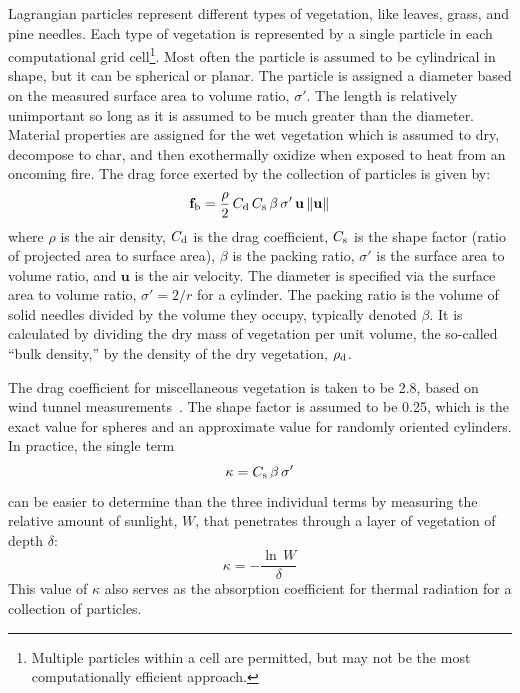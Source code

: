 \documentclass[journal,article,atmosphere,submit,moreauthors,pdftex]{Definitions_Review_Process/mdpi}
\begin{document}
Lagrangian particles represent different types of vegetation, like leaves, grass, and pine needles. Each type of vegetation is represented by a single particle in each computational grid cell\footnote{Multiple particles within a cell are permitted, but may not be the most computationally efficient approach.}. Most often the particle is assumed to be cylindrical in shape, but it can be spherical or planar. The particle is assigned a diameter based on the measured surface area to volume ratio, $\sigma'$. The length is relatively unimportant so long as it is assumed to be much greater than the diameter. Material properties are assigned for the wet vegetation which is assumed to dry, decompose to char, and then exothermally oxidize when exposed to heat from an oncoming fire. The drag force exerted by the collection of particles is given by:
\begin{equation}
   \mathbf{f}_{\rm b} = \frac{\rho}{2} \, C_{\rm d} \, C_{\rm s} \, \beta \, \sigma' \, \mathbf{u} \, \|\mathbf{u}\|
   \label{drag}
\end{equation}
where $\rho$ is the air density, $C_{\rm d}$ is the drag coefficient, $C_{\rm s}$ is the shape factor (ratio of projected area to surface area), $\beta$ is the packing ratio, $\sigma'$ is the surface area to volume ratio, and $\mathbf{u}$ is the air velocity. The diameter is specified via the surface area to volume ratio, $\sigma'=2/r$ for a cylinder. The packing ratio is the volume of solid needles divided by the volume they occupy, typically denoted $\beta$. It is calculated by dividing the dry mass of vegetation per unit volume, the so-called ``bulk density,'' by the density of the dry vegetation, $\rho_{\rm d}$.

The drag coefficient for miscellaneous vegetation is taken to be 2.8, based on wind tunnel measurements~\cite{Falkenstein-Smith:2018}. The shape factor is assumed to be 0.25, which is the exact value for spheres and an approximate value for randomly oriented cylinders. In practice, the single term
\begin{equation}
   \kappa = C_{\rm s}  \, \beta \, \sigma'
\end{equation}
can be easier to determine than the three individual terms by measuring the relative amount of sunlight, $W$, that penetrates through a layer of vegetation of depth $\delta$:
\begin{equation}
   \kappa = -\frac{\ln \, W}{\delta}
\end{equation}
This value of $\kappa$ also serves as the absorption coefficient for thermal radiation for a collection of particles.
\end{document}
